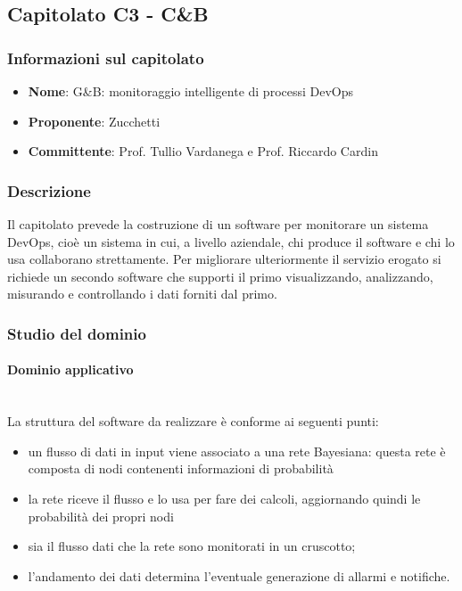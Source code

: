 \subsection{Capitolato C3 - C\&B}
\subsubsection{Informazioni sul capitolato}
\begin{itemize}
	\item \textbf{Nome}: G\&B: monitoraggio intelligente di processi DevOps
	\item \textbf{Proponente}: Zucchetti
	\item \textbf{Committente}: Prof. Tullio Vardanega e Prof. Riccardo Cardin
\end{itemize}
\subsubsection{Descrizione}
Il capitolato prevede la costruzione di un software per monitorare un sistema 
DevOps, cioè un sistema in cui, a livello aziendale, chi produce il software 
e chi lo usa collaborano strettamente. Per migliorare ulteriormente il servizio 
erogato si richiede un secondo software che supporti il primo visualizzando, 
analizzando, misurando e controllando i dati forniti dal primo.
\subsubsection{Studio del dominio}
\paragraph{Dominio applicativo} \mbox{}\\
La struttura del software da realizzare è conforme ai seguenti punti: 
\begin{itemize}
	\item un flusso di dati in input viene associato a una rete Bayesiana: 
	questa rete è composta di nodi contenenti informazioni di probabilità
	\item la rete riceve il flusso e lo usa per fare dei calcoli, aggiornando
	 quindi le probabilità dei propri nodi
	\item sia il flusso dati che la rete sono monitorati in un cruscotto;
	\item l'andamento dei dati determina l'eventuale generazione di allarmi
	 e notifiche.
\end{itemize}
